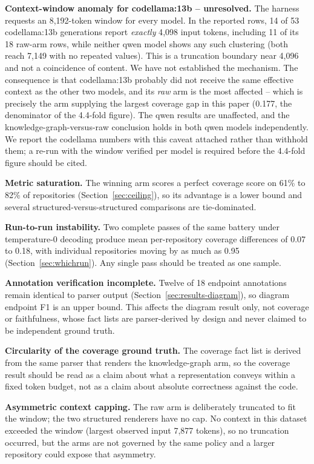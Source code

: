 \documentclass[conference]{IEEEtran}
\begin{document}
\textbf{Context-window anomaly for codellama:13b -- unresolved.} The harness requests an
8{,}192-token window for every model. In the reported rows, 14 of 53 codellama:13b generations
report \emph{exactly} 4{,}098 input tokens, including 11 of its 18 raw-arm rows, while neither
qwen model shows any such clustering (both reach 7{,}149 with no repeated values). This is a
truncation boundary near 4{,}096 and not a coincidence of content. We have not established the
mechanism. The consequence is that codellama:13b probably did not receive the same effective
context as the other two models, and its \emph{raw} arm is the most affected -- which is
precisely the arm supplying the largest coverage gap in this paper (0.177, the denominator of
the 4.4-fold figure). The qwen results are unaffected, and the knowledge-graph-versus-raw
conclusion holds in both qwen models independently. We report the codellama numbers with this
caveat attached rather than withhold them; a re-run with the window verified per model is
required before the 4.4-fold figure should be cited.

\textbf{Metric saturation.} The winning arm scores a perfect coverage score on 61\% to 82\% of
repositories (Section~\ref{sec:ceiling}), so its advantage is a lower bound and several
structured-versus-structured comparisons are tie-dominated.

\textbf{Run-to-run instability.} Two complete passes of the same battery under temperature-0
decoding produce mean per-repository coverage differences of 0.07 to 0.18, with individual
repositories moving by as much as 0.95 (Section~\ref{sec:whichrun}). Any single pass should be
treated as one sample.

\textbf{Annotation verification incomplete.} Twelve of 18 endpoint annotations remain identical
to parser output (Section~\ref{sec:results-diagram}), so diagram endpoint F1 is an upper bound.
This affects the diagram result only, not coverage or faithfulness, whose fact lists are
parser-derived by design and never claimed to be independent ground truth.

\textbf{Circularity of the coverage ground truth.} The coverage fact list is derived from the
same parser that renders the knowledge-graph arm, so the coverage result should be read as a
claim about what a representation conveys within a fixed token budget, not as a claim about
absolute correctness against the code.

\textbf{Asymmetric context capping.} The raw arm is deliberately truncated to fit the window;
the two structured renderers have no cap. No context in this dataset exceeded the window
(largest observed input 7{,}877 tokens), so no truncation occurred, but the arms are not
governed by the same policy and a larger repository could expose that asymmetry.
\end{document}
